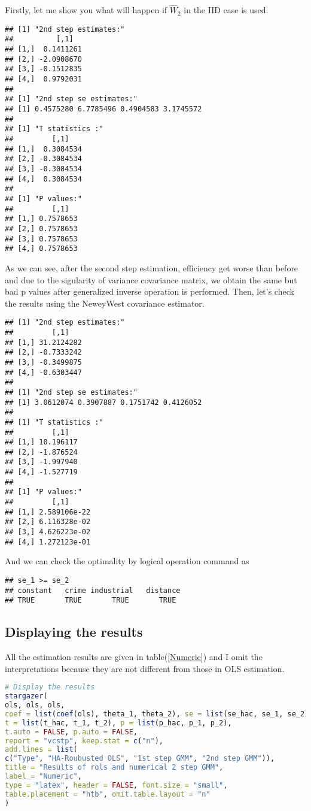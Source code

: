 \documentclass{article}
\theoremstyle{definition}
\begin{document}
Firstly, let me show you what will happen if $\widehat{W}_2 $ in the {\color{blue} IID case} is used.
\begin{verbatim}
## [1] "2nd step estimates:"
##          [,1]
## [1,]  0.1411261
## [2,] -2.0908670
## [3,] -0.1512835
## [4,]  0.9792031
##
## [1] "2nd step se estimates:"
## [1] 0.4575280 6.7785496 0.4904583 3.1745572
##
## [1] "T statistics :"
##         [,1]
## [1,]  0.3084534
## [2,] -0.3084534
## [3,] -0.3084534
## [4,]  0.3084534
##
## [1] "P values:"
##         [,1]
## [1,] 0.7578653
## [2,] 0.7578653
## [3,] 0.7578653
## [4,] 0.7578653
\end{verbatim}

As we can see, after the second step estimation, efficiency get worse than before and due to the sigularity of variance covariance matrix, we obtain the same but bad p values after generalized inverse operation is performed. Then, let's check the results using {\color{blue} the NeweyWest covariance estimator}.
\begin{verbatim}
## [1] "2nd step estimates:"
##         [,1]
## [1,] 31.2124282
## [2,] -0.7333242
## [3,] -0.3499875
## [4,] -0.6303447
## 
## [1] "2nd step se estimates:"
## [1] 3.0612074 0.3907887 0.1751742 0.4126052
## 
## [1] "T statistics :"
##         [,1]
## [1,] 10.196117
## [2,] -1.876524
## [3,] -1.997940
## [4,] -1.527719
##
## [1] "P values:"
##         [,1]
## [1,] 2.589106e-22
## [2,] 6.116328e-02
## [3,] 4.626223e-02
## [4,] 1.272123e-01
\end{verbatim}

And we can check the optimality by logical operation command as
\begin{verbatim}
## se_1 >= se_2
## constant   crime industrial   distance 
## TRUE       TRUE       TRUE       TRUE 
\end{verbatim}


\subsection{Displaying the results}

All the estimation results are given in table(\ref{Numeric}) and I omit the interpretations because they are not different from those in OLS estimation.

\begin{lstlisting}[language=R]
# Display the results
stargazer(
ols, ols, ols, 
coef = list(coef(ols), theta_1, theta_2), se = list(se_hac, se_1, se_2),
t = list(t_hac, t_1, t_2), p = list(p_hac, p_1, p_2),
t.auto = FALSE, p.auto = FALSE,
report = "vcstp", keep.stat = c("n"),
add.lines = list(
c("Type", "HA-Roubusted OLS", "1st step GMM", "2nd step GMM")),
title = "Results of rols and numerical 2 step GMM",
label = "Numeric",
type = "latex", header = FALSE, font.size = "small",
table.placement = "htb", omit.table.layout = "n"
)
\end{lstlisting}
\end{document}
